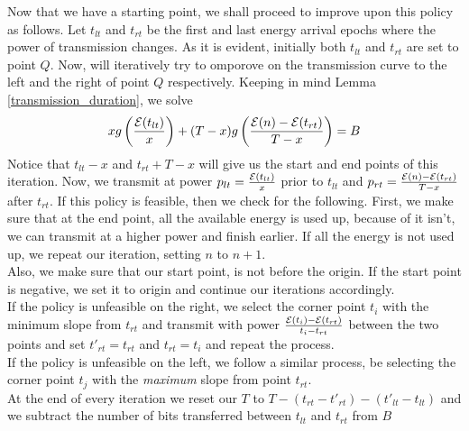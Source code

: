 Now that we have a starting point, we shall proceed to improve upon this policy as follows. Let $t_{lt}$ and $t_{rt}$ be the first and last energy arrival epochs where the power of transmission changes. 
As it is evident, initially both $t_{lt}$ and $t_{rt}$ are set to point $Q$. Now, will iteratively try to omporove on the transmission curve to the left and the right of point $Q$ respectively. 
Keeping in mind Lemma \ref{transmission_duration}, we solve 
\begin{align}
xg\left(\frac{\mathcal{E}(t_{lt})}{x}\right) + (T-x)g\left(\frac{\mathcal{E}(n)-\mathcal{E}(t_{rt})}{T-x}\right) = B
\end{align}
Notice that $t_{lt} - x$ and $t_{rt} + T-x$ will give us the start and end points of this iteration. Now, we transmit at power $p_{lt} = \frac{\mathcal{E}(t_{lt})}{x}$ prior to $t_{lt}$ and $p_{rt} = \frac{\mathcal{E}(n) - \mathcal{E}(t_{rt})}{T-x}$ after $t_{rt}$. 
If this policy is feasible, then we check for the following. First, we make sure that at the end point, all the available energy is used up, because of it isn't, we can transmit at a higher power and finish earlier. 
If all the energy is not used up, we repeat our iteration, setting $n$ to $n+1$. \\
Also, we make sure that our start point, is not before the origin. If the start point is negative, we set it to origin and continue our iterations accordingly.\\

If the policy is unfeasible on the right, we select the corner point $t_i$ with the minimum slope from $t_{rt}$ and transmit with power $\frac{\mathcal{E}(t_i) - \mathcal{E}(t_{rt})}{t_i-t_{rt}}$ between the two points and set $t'_{rt} = t_{rt}$ and $t_{rt} = t_i$ and repeat the process.\\
If the policy is unfeasible on the left, we follow a similar process, be selecting the corner point $t_j$ with the \textit{maximum} slope from point $t_{rt}$.\\
At the end of every iteration we reset our $T$ to $ T - (t_{rt} - t'_{rt}) - (t'_{lt} - t_{lt})$ and we subtract the number of bits transferred between $t_{lt}$ and $t_{rt}$ from $B$



